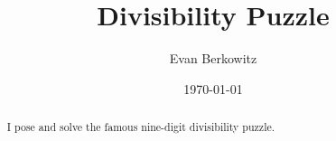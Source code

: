 \documentclass[aps,superscriptaddress,tightenlines,nofootinbib,floatfix,longbibliography,notitlepage]{revtex4-1}
\begin{document}
\title{Divisibility Puzzle}

\author{Evan Berkowitz}

\date{\today}

\begin{abstract}
I pose and solve the famous nine-digit divisibility puzzle.
\end{abstract}

\maketitle





\end{document}

